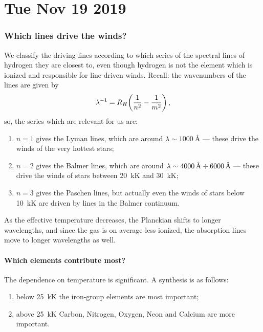 \documentclass[main.tex]{subfiles}
\begin{document}
\section*{Tue Nov 19 2019}

\subsubsection{Which lines drive the winds?}

We classify the driving lines according to which series of the spectral lines of hydrogen they are closest to, even though hydrogen is not the element which is ionized and responsible for line driven winds.
Recall: the wavenumbers of the lines are given by 
%
\begin{align}
\lambda^{-1} = R_H \qty(\frac{1}{n^2}- \frac{1}{m^2})
\,,
\end{align}
%
so, the series which are relevant for us are:
\begin{enumerate}
  \item \(n=1\) gives the Lyman lines, which are around \(\lambda \sim \SI{1000}{\angstrom}\) --- these drive the winds of the very hottest stars;
  \item \(n=2\) gives the Balmer lines, which are around \(\lambda \sim \SI{4000}{\angstrom} \divisionsymbol \SI{6000}{\angstrom}\) --- these drive the winds of stars between \SI{20}{\kilo\kelvin} and \SI{30}{\kilo\kelvin};
  \item \(n=3\) gives the Paschen lines, but actually even the winds of stars below \SI{10}{\kilo\kelvin} are driven by lines in the Balmer continuum.
\end{enumerate}

As the effective temperature decreases, the Planckian shifts to longer wavelengths, and since the gas is on average less ionized, the absorption lines move to longer wavelengths as well.

\paragraph{Which elements contribute most?}

The dependence on temperature is significant. A synthesis is as follows: 
\begin{enumerate}
  \item below \SI{25}{\kilo\kelvin} the iron-group elements are most important;
  \item above \SI{25}{\kilo\kelvin} Carbon, Nitrogen, Oxygen, Neon and Calcium are more important.
\end{enumerate}
\end{document}
